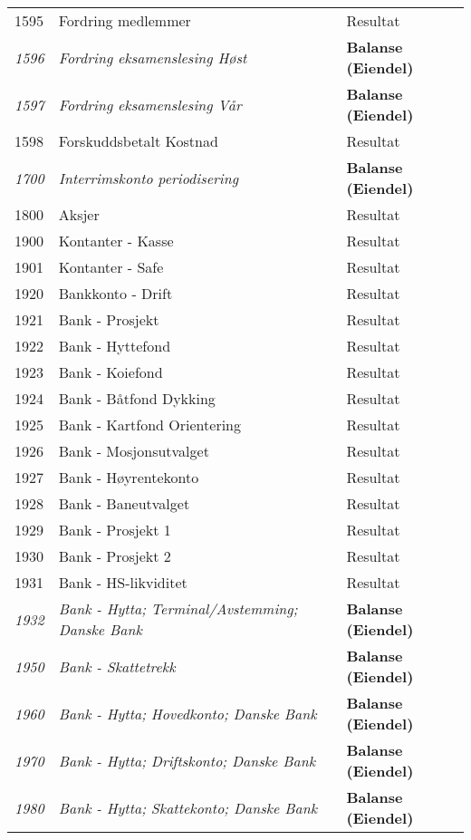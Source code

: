 \begin{table}[H]
\begin{tabular}{l l l }
1595 & Fordring medlemmer & Resultat\\
\emph{1596} & \emph{Fordring eksamenslesing Høst} & {\bfseries Balanse (Eiendel)}\\
\emph{1597} & \emph{Fordring eksamenslesing Vår} & {\bfseries Balanse (Eiendel)}\\
1598 & Forskuddsbetalt Kostnad & Resultat\\
\emph{1700} & \emph{Interrimskonto periodisering} & {\bfseries Balanse (Eiendel)}\\
1800 & Aksjer & Resultat\\
1900 & Kontanter - Kasse & Resultat\\
1901 & Kontanter - Safe & Resultat\\
1920 & Bankkonto - Drift & Resultat\\
1921 & Bank - Prosjekt & Resultat\\
1922 & Bank - Hyttefond & Resultat\\
1923 & Bank - Koiefond & Resultat\\
1924 & Bank - Båtfond Dykking & Resultat\\
1925 & Bank - Kartfond Orientering & Resultat\\
1926 & Bank - Mosjonsutvalget & Resultat\\
1927 & Bank - Høyrentekonto & Resultat\\
1928 & Bank - Baneutvalget & Resultat\\
1929 & Bank - Prosjekt 1 & Resultat\\
1930 & Bank - Prosjekt 2 & Resultat\\
1931 & Bank - HS-likviditet & Resultat\\
\emph{1932} & \emph{Bank - Hytta; Terminal/Avstemming; Danske Bank} & {\bfseries Balanse (Eiendel)}\\
\emph{1950} & \emph{Bank - Skattetrekk} & {\bfseries Balanse (Eiendel)}\\
\emph{1960} & \emph{Bank - Hytta; Hovedkonto; Danske Bank} & {\bfseries Balanse (Eiendel)}\\
\emph{1970} & \emph{Bank - Hytta; Driftskonto; Danske Bank} & {\bfseries Balanse (Eiendel)}\\
\emph{1980} & \emph{Bank - Hytta; Skattekonto; Danske Bank} & {\bfseries Balanse (Eiendel)}\\
	\end{tabular}
\end{table}
